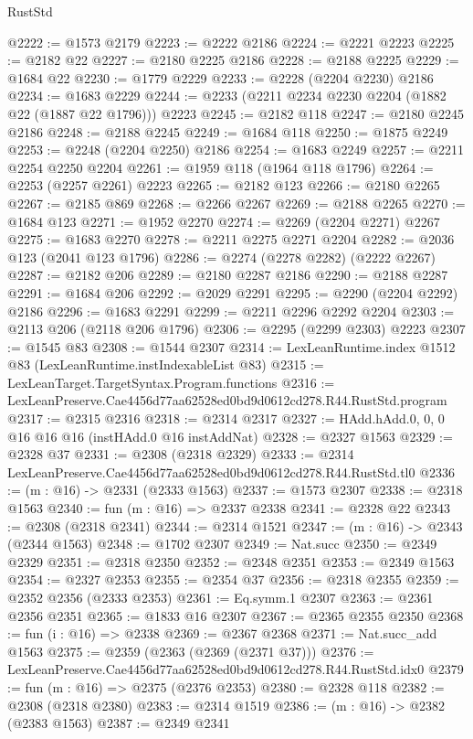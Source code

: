 \begin{lexlean}{RustStd}
\begin{coremodule}
@2222 := @1573 @2179
@2223 := @2222 @2186
@2224 := @2221 @2223
@2225 := @2182 @22
@2227 := @2180 @2225 @2186
@2228 := @2188 @2225
@2229 := @1684 @22
@2230 := @1779 @2229
@2233 := @2228 (@2204 @2230) @2186
@2234 := @1683 @2229
@2244 := @2233 (@2211 @2234 @2230 @2204 (@1882 @22 (@1887 @22 @1796))) @2223
@2245 := @2182 @118
@2247 := @2180 @2245 @2186
@2248 := @2188 @2245
@2249 := @1684 @118
@2250 := @1875 @2249
@2253 := @2248 (@2204 @2250) @2186
@2254 := @1683 @2249
@2257 := @2211 @2254 @2250 @2204
@2261 := @1959 @118 (@1964 @118 @1796)
@2264 := @2253 (@2257 @2261) @2223
@2265 := @2182 @123
@2266 := @2180 @2265
@2267 := @2185 @869
@2268 := @2266 @2267
@2269 := @2188 @2265
@2270 := @1684 @123
@2271 := @1952 @2270
@2274 := @2269 (@2204 @2271) @2267
@2275 := @1683 @2270
@2278 := @2211 @2275 @2271 @2204
@2282 := @2036 @123 (@2041 @123 @1796)
@2286 := @2274 (@2278 @2282) (@2222 @2267)
@2287 := @2182 @206
@2289 := @2180 @2287 @2186
@2290 := @2188 @2287
@2291 := @1684 @206
@2292 := @2029 @2291
@2295 := @2290 (@2204 @2292) @2186
@2296 := @1683 @2291
@2299 := @2211 @2296 @2292 @2204
@2303 := @2113 @206 (@2118 @206 @1796)
@2306 := @2295 (@2299 @2303) @2223
@2307 := @1545 @83
@2308 := @1544 @2307
@2314 := LexLeanRuntime.index @1512 @83 (LexLeanRuntime.instIndexableList @83)
@2315 := LexLeanTarget.TargetSyntax.Program.functions
@2316 := LexLeanPreserve.Cae4456d77aa62528ed0bd9d0612cd278.R44.RustStd.program
@2317 := @2315 @2316
@2318 := @2314 @2317
@2327 := HAdd.hAdd.{0, 0, 0} @16 @16 @16 (instHAdd.{0} @16 instAddNat)
@2328 := @2327 @1563
@2329 := @2328 @37
@2331 := @2308 (@2318 @2329)
@2333 := @2314 LexLeanPreserve.Cae4456d77aa62528ed0bd9d0612cd278.R44.RustStd.tl0
@2336 := (m : @16) -> @2331 (@2333 @1563)
@2337 := @1573 @2307
@2338 := @2318 @1563
@2340 := fun (m : @16) => @2337 @2338
@2341 := @2328 @22
@2343 := @2308 (@2318 @2341)
@2344 := @2314 @1521
@2347 := (m : @16) -> @2343 (@2344 @1563)
@2348 := @1702 @2307
@2349 := Nat.succ
@2350 := @2349 @2329
@2351 := @2318 @2350
@2352 := @2348 @2351
@2353 := @2349 @1563
@2354 := @2327 @2353
@2355 := @2354 @37
@2356 := @2318 @2355
@2359 := @2352 @2356 (@2333 @2353)
@2361 := Eq.symm.{1} @2307
@2363 := @2361 @2356 @2351
@2365 := @1833 @16 @2307
@2367 := @2365 @2355 @2350
@2368 := fun (i : @16) => @2338
@2369 := @2367 @2368
@2371 := Nat.succ_add @1563
@2375 := @2359 (@2363 (@2369 (@2371 @37)))
@2376 := LexLeanPreserve.Cae4456d77aa62528ed0bd9d0612cd278.R44.RustStd.idx0
@2379 := fun (m : @16) => @2375 (@2376 @2353)
@2380 := @2328 @118
@2382 := @2308 (@2318 @2380)
@2383 := @2314 @1519
@2386 := (m : @16) -> @2382 (@2383 @1563)
@2387 := @2349 @2341

\end{coremodule}
\end{lexlean}
